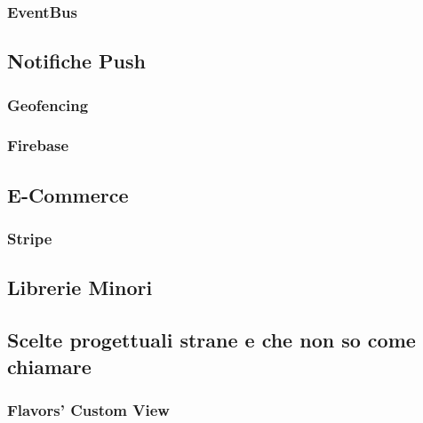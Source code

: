 \subsubsection{EventBus}

\subsection{Notifiche Push}

\subsubsection{Geofencing}

\subsubsection{Firebase}

\subsection{E-Commerce}

\subsubsection{Stripe}

\subsection{Librerie Minori}

\subsection{Scelte progettuali strane e che non so come chiamare}

\subsubsection{Flavors’ Custom View}

\newpage
